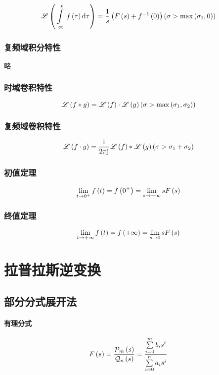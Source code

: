 \documentclass{article}
\begin{document}
\[\mathscr L\left(\int\limits_{-\infty}^tf\left(\tau\right)\mathrm d\tau\right)=
    \frac1s\left(F\left(s\right)+f^{-1}\left(0\right)\right)
    \left(\sigma>\max\left(\sigma_1,0\right)\right)\]

\subsubsection{复频域积分特性}

略

\subsubsection{时域卷积特性}

\[\mathscr L\left(f\ast g\right)=\mathscr L\left(f\right)\cdot\mathscr L\left(g\right)
    \left(\sigma>\max\left(\sigma_1,\sigma_2\right)\right)\]

\subsubsection{复频域卷积特性}

\[\mathscr L\left(f\cdot g\right)=
    \frac1{2\pi\mathrm j}\mathscr L\left(f\right)\ast\mathscr L\left(g\right)
    \left(\sigma>\sigma_1+\sigma_2\right)\]

\subsubsection{初值定理}

\[\lim_{t\to0^+}f\left(t\right)=f\left(0^+\right)=\lim_{s\to+\infty}sF\left(s\right)\]

\subsubsection{终值定理}

\[\lim_{t\to+\infty}f\left(t\right)=f\left(+\infty\right)=\lim_{s\to0}sF\left(s\right)\]

\section{拉普拉斯逆变换}

\subsection{部分分式展开法\label{部分分式展开法}}

\paragraph{有理分式}

\[F\left(s\right)=\frac{\mathcal P_m\left(s\right)}{\mathcal Q_n\left(s\right)}
    =\frac{\sum\limits_{i=0}^mb_is^i}{\sum\limits_{i=0}^na_is^i}\]
\end{document}
